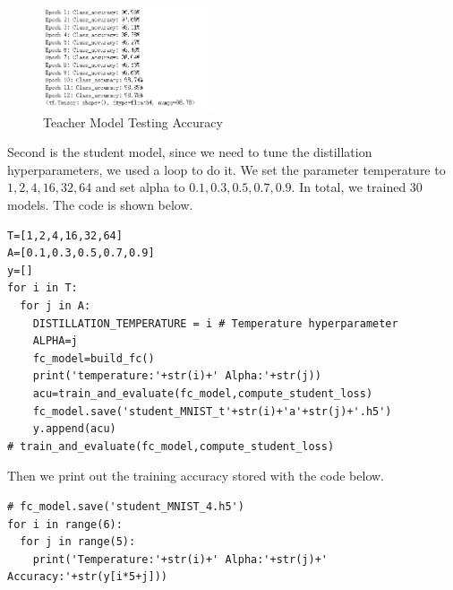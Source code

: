 \documentclass[conference]{IEEEtran}
\begin{document}
\begin{figure}[h] 
    \centering
    \includegraphics[width=0.45\textwidth]{./graphs/teacher_accuracy_mnist.png}
    \caption{Teacher Model Testing Accuracy}
    \label{Fig.t1q3e}
\end{figure}
Second is the student model, since we need to tune the distillation hyperparameters, we used a loop to do it.
We set the parameter temperature to $1,2,4,16,32,64$ and set alpha to $0.1,0.3,0.5,0.7,0.9$. In total, we trained 30 models.
The code is shown below.
\begin{lstlisting}
T=[1,2,4,16,32,64]
A=[0.1,0.3,0.5,0.7,0.9]
y=[]
for i in T:
  for j in A:
    DISTILLATION_TEMPERATURE = i # Temperature hyperparameter
    ALPHA=j
    fc_model=build_fc()
    print('temperature:'+str(i)+' Alpha:'+str(j))
    acu=train_and_evaluate(fc_model,compute_student_loss)
    fc_model.save('student_MNIST_t'+str(i)+'a'+str(j)+'.h5')
    y.append(acu)
# train_and_evaluate(fc_model,compute_student_loss)
\end{lstlisting}
Then we print out the training accuracy stored with the code below.
\begin{lstlisting}
# fc_model.save('student_MNIST_4.h5')
for i in range(6):
  for j in range(5):
    print('Temperature:'+str(i)+' Alpha:'+str(j)+' Accuracy:'+str(y[i*5+j]))
\end{lstlisting}
\end{document}
